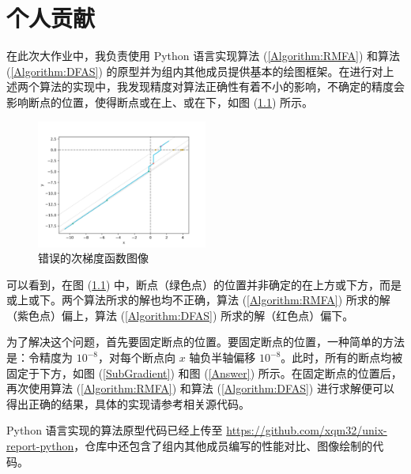 
\chapter{个人贡献}

在此次大作业中，我负责使用 Python 语言实现算法 (\ref{Algorithm:RMFA}) 和算法 (\ref{Algorithm:DFAS}) 的原型并为组内其他成员提供基本的绘图框架。在进行对上述两个算法的实现中，我发现精度对算法正确性有着不小的影响，不确定的精度会影响断点的位置，使得断点或在上、或在下，如图 (\ref{Error}) 所示。

\begin{figure}[htb]
    \centering
    \includegraphics[width=0.5\textwidth]{figures/Error.png}
    \caption{错误的次梯度函数图像}
    \label{Error}
\end{figure}

可以看到，在图 (\ref{Error}) 中，断点（绿色点）的位置并非确定的在上方或下方，而是或上或下。两个算法所求的解也均不正确，算法 (\ref{Algorithm:RMFA}) 所求的解（紫色点）偏上，算法 (\ref{Algorithm:DFAS}) 所求的解（红色点）偏下。

为了解决这个问题，首先要固定断点的位置。要固定断点的位置，一种简单的方法是：令精度为 $10^{-8}$，对每个断点向 $x$ 轴负半轴偏移 $10^{-8}$。此时，所有的断点均被固定于下方，如图 (\ref{SubGradient}) 和图 (\ref{Answer}) 所示。在固定断点的位置后，再次使用算法 (\ref{Algorithm:RMFA}) 和算法 (\ref{Algorithm:DFAS}) 进行求解便可以得出正确的结果，具体的实现请参考相关源代码。

Python 语言实现的算法原型代码已经上传至 \href{https://github.com/xqm32/unix-report-python}{https://github.com/xqm32/unix-report-python}，仓库中还包含了组内其他成员编写的性能对比、图像绘制的代码。